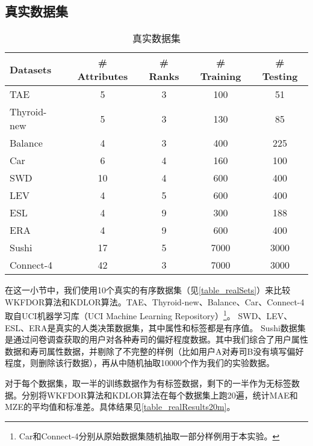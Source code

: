 \subsection{真实数据集}
\label{wkfdor_realData}

\begin{table}[!htbp]
\caption{真实数据集}
\label{table_realSets}
\centering
\begin{tabular}{l|cccc}
\toprule
Datasets & \# Attributes & \# Ranks & \# Training & \# Testing\\
\midrule
TAE & 5 & 3 & 100 & 51\\
Thyroid-new & 5 & 3 & 130 & 85\\
Balance & 4 & 3 & 400 & 225\\
Car & 6 & 4 & 160 & 100\\
SWD & 10 & 4 & 600 & 400\\
LEV & 4 & 5 & 600 & 400\\
ESL & 4 & 9 & 300 & 188\\
ERA & 4 & 9 & 600 & 400\\
Sushi & 17 & 5 & 7000 & 3000 \\
Connect-4 & 42 & 3 & 7000 & 3000\\
\bottomrule
\end{tabular}
\end{table}

在这一小节中，我们使用10个真实的有序数据集（见\autoref{table_realSets}）来比较WKFDOR算法和KDLOR算法。TAE、Thyroid-new、Balance、Car、Connect-4取自UCI机器学习库（UCI Machine Learning Repository）\footnote{Car和Connect-4分别从原始数据集随机抽取一部分样例用于本实验。}\citep{Bache+Lichman:2013}。
SWD、LEV、ESL、ERA是真实的人类决策数据集，其中属性和标签都是有序值\citep{ben2006generating}。
Sushi数据集\citep{kamishima2009efficient}是通过问卷调查获取的用户对各种寿司的偏好程度数据。其中我们综合了用户属性数据和寿司属性数据，并剔除了不完整的样例（比如用户A对寿司B没有填写偏好程度，则删除该行数据），再从中随机抽取10000个作为我们的实验数据。

对于每个数据集，取一半的训练数据作为有标签数据，剩下的一半作为无标签数据。分别将WKFDOR算法和KDLOR算法在每个数据集上跑20遍，统计MAE和MZE的平均值和标准差。具体结果见\autoref{table_realResults20m}。

